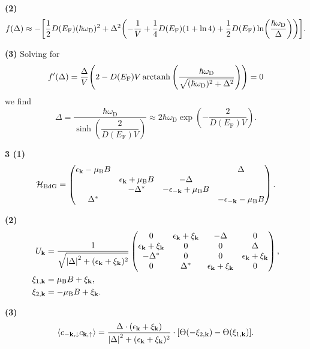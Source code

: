 \documentclass{article}
\makeatletter
\newcommand*{\shifttext}[1]{%
  \settowidth{\@tempdima}{#1}%
  \hspace{-\@tempdima}#1%
}
\newcommand{\plabel}[1]{%
\shifttext{\textbf{#1}\quad}%
}
\newcommand{\prule}{%
\begin{center}%
\hdashrule[0.5ex]{.99\linewidth}{1pt}{1pt 2.5pt}%
\end{center}%
}
\newcommand{\minusbaseline}{\abovedisplayskip=0pt\abovedisplayshortskip=0pt~\vspace*{-\baselineskip}}%
\makeatother
\begin{document}
\plabel{(2)}%
\begingroup\minusbaseline
\[ f(\Delta) \approx -\qty[\frac{1}{2}D(E_{\mathrm{F}})(\hbar\omega_{\mathrm{D}})^2+{\Delta^2}\qty(-\frac{1}{V}+ \frac{1}{4}D(E_{\mathrm{F}})(1+\ln 4) + \frac{1}{2} D(E_{\mathrm{F}}) \ln(\frac{\hbar\omega_{\mathrm{D}}}{\Delta}) )]. \]
\endgroup

\plabel{(3)}%
Solving for
\[ f'(\Delta) = \frac{\Delta}{V}\qty(2 - D(E_{\mathrm{F}}) V \operatorname{arctanh} \qty(\frac{\hbar \omega_{\mathrm{D}}}{\sqrt{(\hbar\omega_{\mathrm{D}})^2 + \Delta^2}})) = 0 \]
we find
\[ \Delta = \frac{\hbar\omega_{\mathrm{D}}}{\sinh(\dfrac{2}{D(E_{\mathrm{F}}) V})} \approx 2 \hbar\omega_{\mathrm{D}} \exp(-\frac{2}{D(E_{\mathrm{F}}) V}). \]

\prule

\plabel{3 (1)}%
\begingroup\minusbaseline%
\[ \mathcal{H}_{\mathrm{BdG}} = \begin{pmatrix}
  \epsilon_{\vb{k}} - \mu_{\mathrm{B}} B & & & \Delta \\
  & \epsilon_{\vb{k}} + \mu_{\mathrm{B}} B & -\Delta & \\
  & -\Delta^* & -\epsilon_{-\vb{k}} + \mu_{\mathrm{B}} B & \\
  \Delta^* & & & -\epsilon_{-\vb{k}} - \mu_{\mathrm{B}} B
\end{pmatrix}. \]
\endgroup

\plabel{(2)}%
\begingroup\minusbaseline%
\begin{align*}
  {U_{\vb{k}}} &= \frac{1}{\sqrt{\abs{\Delta}^2 + (\epsilon_{\vb{k}} + \xi_{\vb{k}})^2}} \begin{pmatrix}
    0 & \epsilon_{\vb{k}} + \xi_{\vb{k}} & -\Delta & 0 \\
    \epsilon_{\vb{k}} + \xi_{\vb{k}} & 0 & 0 & \Delta \\
    -\Delta^* & 0 & 0 & \epsilon_{\vb{k}} + \xi_{\vb{k}} \\
    0 & \Delta^* & \epsilon_{\vb{k}} + \xi_{\vb{k}} & 0
  \end{pmatrix}, \\
  \xi_{1,\vb{k}} &= \mu_{\mathrm{B}}B+\xi_{\vb{k}}, \\
  \xi_{2,\vb{k}} &= -\mu_{\mathrm{B}}B+\xi_{\vb{k}}.
\end{align*}
\endgroup

\plabel{(3)}%
\begingroup\minusbaseline%
\[ \langle c_{-\vb{k},\downarrow} c_{\vb{k},\uparrow} \rangle = \frac{\Delta \cdot (\epsilon_{\vb{k}} + \xi_{\vb{k}})}{\abs{\Delta}^2 + (\epsilon_{\vb{k}} + \xi_{\vb{k}})^2} \cdot \qty[\Theta(-\xi_{2,\vb{k}}) - \Theta(\xi_{1,\vb{k}})]. \]
\endgroup
\end{document}
